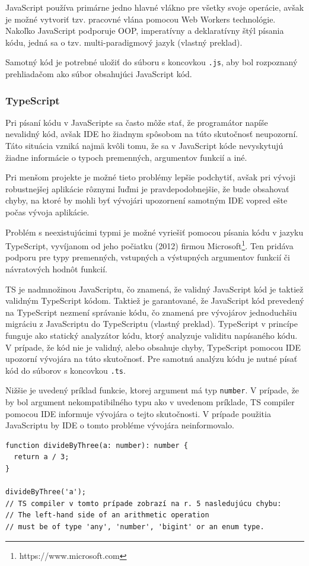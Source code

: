 JavaScript používa primárne jedno hlavné vlákno pre všetky svoje operácie, avšak je možné vytvoriť tzv. pracovné vlána pomocou Web Workers technológie. Nakoľko JavaScript podporuje OOP, imperatívny a deklaratívny štýl písania kódu, jedná sa o tzv. multi-paradigmový jazyk \cite{ecmascript_specification} (vlastný preklad).

Samotný kód je potrebné uložiť do súboru s koncovkou \texttt{.js}, aby bol rozpoznaný prehliadačom ako súbor obsahujúci JavaScript kód.

\subsubsection {TypeScript}
Pri písaní kódu v JavaScripte sa často môže stať, že programátor napíše nevalidný kód, avšak IDE ho žiadnym spôsobom na túto skutočnosť neupozorní. Táto situácia vzniká najmä kvôli tomu, že sa v JavaScript kóde nevyskytujú žiadne informácie o typoch premenných, argumentov funkcií a iné.

Pri menšom projekte je možné tieto problémy lepšie podchytiť, avšak pri vývoji robustnejšej aplikácie rôznymi ľuďmi je pravdepodobnejšie, že bude obsahovať chyby, na ktoré by mohli byť vývojári upozornení samotným IDE vopred ešte počas vývoja aplikácie.

Problém s neexistujúcimi typmi je možné vyriešiť pomocou písania kódu v jazyku TypeScript, vyvíjanom od jeho počiatku (2012) firmou Microsoft\footnote{https://www.microsoft.com}. Ten pridáva podporu pre typy premenných, vstupných a výstupných argumentov funkcií či návratových hodnôt funkcií.

TS je nadmnožinou JavaScriptu, čo znamená, že validný JavaScript kód je taktiež validným TypeScript kódom. Taktiež je garantované, že JavaScript kód prevedený na TypeScript nezmení správanie kódu, čo znamená pre vývojárov jednoduchšiu migráciu z JavaScriptu do TypeScriptu \cite{about_typescript} (vlastný preklad). TypeScript v princípe funguje ako statický analyzátor kódu, ktorý analyzuje validitu napísaného kódu. V prípade, že kód nie je validný, alebo obsahuje chyby, TypeScript pomocou IDE upozorní vývojára na túto skutočnosť. Pre samotnú analýzu kódu je nutné písať kód do súborov s koncovkou \texttt{.ts}.

Nižšie je uvedený príklad funkcie, ktorej argument má typ \texttt{number}. V prípade, že by bol argument nekompatibilného typu ako v uvedenom príklade, TS compiler pomocou IDE informuje vývojára o tejto skutočnosti. V prípade použitia JavaScriptu by IDE o tomto probléme vývojára neinformovalo. 
\begin{verbatim}
function divideByThree(a: number): number {
  return a / 3;
}

divideByThree('a');
// TS compiler v tomto prípade zobrazí na r. 5 nasledujúcu chybu:
// The left-hand side of an arithmetic operation
// must be of type 'any', 'number', 'bigint' or an enum type.
\end{verbatim}


